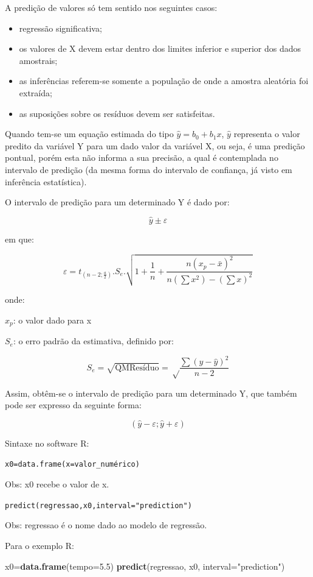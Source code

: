 \documentclass[12pt,brazil,oneside]{book}
\newenvironment{Shaded}{\begin{snugshade}}{\end{snugshade}}
\newcommand{\DataTypeTok}[1]{\textcolor[rgb]{0.13,0.29,0.53}{#1}}
\newcommand{\FloatTok}[1]{\textcolor[rgb]{0.00,0.00,0.81}{#1}}
\newcommand{\KeywordTok}[1]{\textcolor[rgb]{0.13,0.29,0.53}{\textbf{#1}}}
\newcommand{\NormalTok}[1]{#1}
\newcommand{\StringTok}[1]{\textcolor[rgb]{0.31,0.60,0.02}{#1}}
\providecommand{\tightlist}{%
  \setlength{\itemsep}{0pt}\setlength{\parskip}{0pt}}
\begin{document}
A predição de valores só tem sentido nos seguintes casos:

\begin{itemize}
\tightlist
\item
  regressão significativa;
\item
  os valores de X devem estar dentro dos limites inferior e superior dos dados amostrais;
\item
  as inferências referem-se somente a população de onde a amostra aleatória foi extraída;
\item
  as suposições sobre os resíduos devem ser satisfeitas.
\end{itemize}

Quando tem-se um equação estimada do tipo \(\hat{y} = b_0 + b_1x\), \(\hat{y}\) representa o valor predito da variável Y para um dado valor da variável X, ou seja, é uma predição pontual, porém esta não informa a sua precisão, a qual é contemplada no intervalo de predição (da mesma forma do intervalo de confiança, já visto em inferência estatística).

O intervalo de predição para um determinado Y é dado por:

\[
\hat{y}\pm \varepsilon
\]

em que:

\[
\varepsilon = t_{(n-2;\frac{a}{2})}.S_e. \sqrt{ 1+ \frac{1}{n} +  \frac{n(x_p-\bar{x})^2}{n(\sum x^2)-(\sum x)^2} }
\]

onde:

\(x_p\): o valor dado para x

\(S_e\): o erro padrão da estimativa, definido por:

\[
S_e=\sqrt {\textrm{QMResíduo}}=\sqrt\frac{\sum(y-\hat{y})^2}{n-2}
\]

Assim, obtêm-se o intervalo de predição para um determinado Y, que também pode ser expresso da seguinte forma:

\[
(\hat{y} - \varepsilon; \hat{y} + \varepsilon)
\]

Sintaxe no software R:

\texttt{x0=data.frame(x=valor\_numérico)}

Obs: x0 recebe o valor de x.

\texttt{predict(regressao,x0,interval="prediction")}

Obs: regressao é o nome dado ao modelo de regressão.

Para o exemplo R:

\begin{Shaded}
\begin{Highlighting}[]
\NormalTok{x0=}\KeywordTok{data.frame}\NormalTok{(}\DataTypeTok{tempo=}\FloatTok{5.5}\NormalTok{)}
\KeywordTok{predict}\NormalTok{(regressao, x0, }\DataTypeTok{interval=}\StringTok{"prediction"}\NormalTok{)}
\end{Highlighting}
\end{Shaded}
\end{document}
